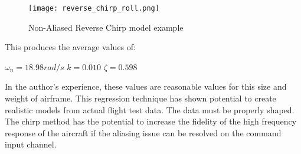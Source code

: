 \begin{figure}[!h]
 \centering
  \texttt{[image: reverse\_chirp\_roll.png]}
  \caption{Non-Aliased Reverse Chirp model example}
  \label{fig:reverse_chirp_model}
\end{figure}

This produces the average values of:

$\omega_n=18.98 rad/s$ \newline
$k = 0.010$ \newline
$\zeta=0.598$ \newline

In the author's experience, these values are reasonable values for this size and weight of airframe.  This regression technique has shown potential to create realistic models from actual flight test data.  The data must be properly shaped.  The chirp method has the potential to increase the fidelity of the high frequency response of the aircraft if the aliasing issue can be resolved on the command input channel.